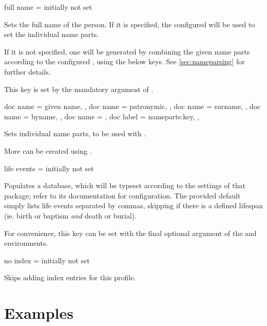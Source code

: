 \documentclass[
	a4paper,
]{article}
\begin{document}
\begin{docKey}
	{full name}
	{=}
	{initially not set}

	Sets the full name of the person. If it is specified, the configured  will be used to set the individual name parts.

	If it is not specified, one will be generated by combining the given name parts according to the configured , using the below keys. See \cref{sec:nameparsing} for further details.
	
	This key is set by the mandatory argument of .
\end{docKey}

\begin{docKeys}
	[
		doc parameter = {=\meta{...}},
		doc description = {initially not set},
	]
	{
		{
			doc name = given name,
		},
		{
			doc name = patronymic,
		},
		{
			doc name = surname,
		},
		{
			doc name = byname,
		},
		{
			doc name = ,
			doc label = nameparts:key,
		},
	}

	Sets individual name parts, to be used with .

	More can be created using .
\end{docKeys}

\begin{docKey}
	{life events}
	{=}
	{initially not set}

	Populates a  database, which will be typeset according to the settings of that package; refer to its documentation for configuration. The provided default simply lists life events separated by commas, skipping  if there is a defined lifespan (ie. birth or baptism \emph{and} death or burial).

	For convenience, this key can be set with the final optional argument of the  and  environments.
\end{docKey}

\begin{docKey}
	{no index}
	{=}
	{initially not set}

	Skips adding index entries for this profile.
\end{docKey}

\clearpage
\section{Examples} %
\end{document}
